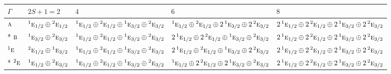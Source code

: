 \documentclass[10pt,a4paper]{article}
\numberwithin{equation}{section}
\newcommand{\irr}[1]{\text{\normalfont\scshape #1}}
\newcommand{\conjpair}[1]{{}^{#1}}
\begin{document}
{\small\setlength{\tabcolsep}{3pt}\begin{longtable}{@{}l>{\RaggedRight\arraybackslash}p{}>{\RaggedRight\arraybackslash}p{}>{\RaggedRight\arraybackslash}p{}>{\RaggedRight\arraybackslash}p{}@{}}\toprule
$\Gamma$ & $2S + 1 = 2$ & $4$ & $6$ & $8$\\\midrule\endhead
\bottomrule\endfoot\endlastfoot
$\irr{a}$ & $\conjpair{1}\irr{e}_{1/2}\oplus \conjpair{2}\irr{e}_{1/2}$ & $\conjpair{1}\irr{e}_{1/2}\oplus \conjpair{2}\irr{e}_{1/2}\oplus \conjpair{1}\irr{e}_{3/2}\oplus \conjpair{2}\irr{e}_{3/2}$ & $\conjpair{1}\irr{e}_{1/2}\oplus \conjpair{2}\irr{e}_{1/2}\oplus 2\,\conjpair{1}\irr{e}_{3/2}\oplus 2\,\conjpair{2}\irr{e}_{3/2}$ & $2\,\conjpair{1}\irr{e}_{1/2}\oplus 2\,\conjpair{2}\irr{e}_{1/2}\oplus 2\,\conjpair{1}\irr{e}_{3/2}\oplus 2\,\conjpair{2}\irr{e}_{3/2}$\\*
$\irr{b}$ & $\conjpair{1}\irr{e}_{3/2}\oplus \conjpair{2}\irr{e}_{3/2}$ & $\conjpair{1}\irr{e}_{1/2}\oplus \conjpair{2}\irr{e}_{1/2}\oplus \conjpair{1}\irr{e}_{3/2}\oplus \conjpair{2}\irr{e}_{3/2}$ & $2\,\conjpair{1}\irr{e}_{1/2}\oplus 2\,\conjpair{2}\irr{e}_{1/2}\oplus \conjpair{1}\irr{e}_{3/2}\oplus \conjpair{2}\irr{e}_{3/2}$ & $2\,\conjpair{1}\irr{e}_{1/2}\oplus 2\,\conjpair{2}\irr{e}_{1/2}\oplus 2\,\conjpair{1}\irr{e}_{3/2}\oplus 2\,\conjpair{2}\irr{e}_{3/2}$\\
$\conjpair{1}\irr{e}$ & $\conjpair{2}\irr{e}_{1/2}\oplus \conjpair{1}\irr{e}_{3/2}$ & $\conjpair{1}\irr{e}_{1/2}\oplus \conjpair{2}\irr{e}_{1/2}\oplus \conjpair{1}\irr{e}_{3/2}\oplus \conjpair{2}\irr{e}_{3/2}$ & $2\,\conjpair{1}\irr{e}_{1/2}\oplus \conjpair{2}\irr{e}_{1/2}\oplus \conjpair{1}\irr{e}_{3/2}\oplus 2\,\conjpair{2}\irr{e}_{3/2}$ & $2\,\conjpair{1}\irr{e}_{1/2}\oplus 2\,\conjpair{2}\irr{e}_{1/2}\oplus 2\,\conjpair{1}\irr{e}_{3/2}\oplus 2\,\conjpair{2}\irr{e}_{3/2}$\\*
$\conjpair{2}\irr{e}$ & $\conjpair{1}\irr{e}_{1/2}\oplus \conjpair{2}\irr{e}_{3/2}$ & $\conjpair{1}\irr{e}_{1/2}\oplus \conjpair{2}\irr{e}_{1/2}\oplus \conjpair{1}\irr{e}_{3/2}\oplus \conjpair{2}\irr{e}_{3/2}$ & $\conjpair{1}\irr{e}_{1/2}\oplus 2\,\conjpair{2}\irr{e}_{1/2}\oplus 2\,\conjpair{1}\irr{e}_{3/2}\oplus \conjpair{2}\irr{e}_{3/2}$ & $2\,\conjpair{1}\irr{e}_{1/2}\oplus 2\,\conjpair{2}\irr{e}_{1/2}\oplus 2\,\conjpair{1}\irr{e}_{3/2}\oplus 2\,\conjpair{2}\irr{e}_{3/2}$\\
\bottomrule\end{longtable}}
\end{document}

